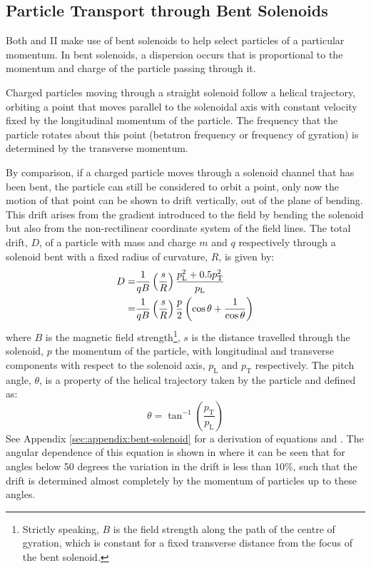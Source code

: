 \subsection{Particle Transport through Bent Solenoids}
\FigBentSolenoidRelativeDrift
Both \phaseI and II make use of bent solenoids to help select particles of a particular momentum.
In bent solenoids, a dispersion occurs that is proportional to the momentum and charge of the particle passing through it.

Charged particles moving through a straight solenoid follow a helical
trajectory, orbiting a point that moves parallel to the solenoidal axis with constant velocity fixed by the longitudinal momentum of the particle.
The frequency that the particle rotates about this point (betatron frequency or frequency of gyration) is determined by the transverse momentum.

By comparison, if a charged particle moves through a solenoid channel that has been bent, the particle can still be considered to orbit a point, only now 
the motion of that point can be shown to drift vertically, out of the plane of bending.  This drift arises from the gradient introduced to the field by bending the solenoid but also from the 
non-rectilinear coordinate system of the field lines.  
The total drift, $D$, of a particle with mass and charge $m$ and $q$ respectively  through a solenoid bent with a fixed radius of curvature, $R$, is given by:
\begin{align}
	D=&\frac{1}{qB}\left(\frac{s}{R}\right)\frac{p^2_\mathrm{L}+0.5p^2_\mathrm{T}}{p_\mathrm{L}}\eqlabel{detector:bent-solenoids:longVstrans}\\
	 =&\frac{1}{qB}\left(\frac{s}{R}\right)\frac{p}{2}\left(\cos\theta + \frac{1}{\cos\theta}\right)\eqlabel{detector:bent-solenoids:pitchAngle}
\end{align}
where $B$ is the magnetic field strength\footnote{Strictly speaking, $B$ is the field strength along the path of the centre of gyration, which is constant for a fixed transverse distance from the focus of the bent solenoid.},
$s$ is the distance travelled through the solenoid, $p$ the momentum of the particle, with longitudinal and transverse components with respect to the solenoid axis, $p_\mathrm{L}$ and $p_\mathrm{T}$ respectively.
The pitch angle, $\theta$, is a property of the helical trajectory taken by the particle and defined as:
\begin{equation}
\theta=\tan^{-1}\left(\frac{p_\mathrm{T}}{p_\mathrm{L}}\right)
\end{equation}
See Appendix \ref{sec:appendix:bent-solenoid} for a derivation of equations  and .
The angular dependence of this equation is shown in  where it can be seen that for angles below 50 degrees the variation in the drift is less than 10\%, such that the drift is determined almost completely by the momentum of particles up to these angles.

